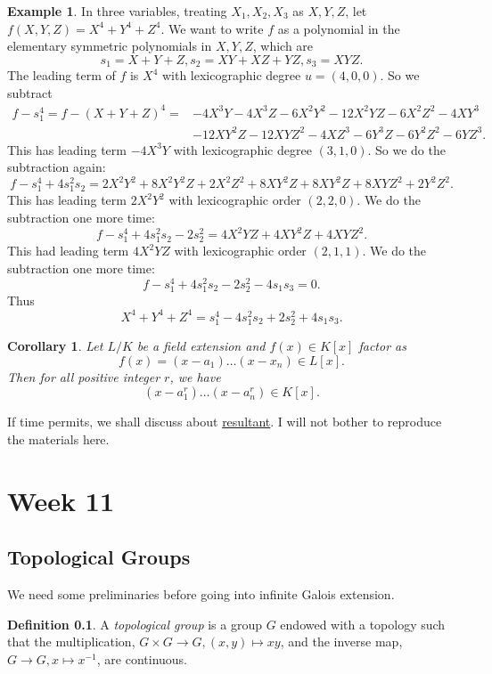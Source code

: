 \documentclass[12pt]{report}
\newtheorem{corollary}[theorem]{Corollary}
\theoremstyle{definition}
\newtheorem{definition}[theorem]{Definition}
\newtheorem{example}[theorem]{Example}
\begin{document}
\begin{example}
	In three variables, treating $X_1,X_2,X_3$ as $X,Y,Z$, let $f(X,Y,Z)=X^4+Y^4+Z^4$. We want to write $f$ as a polynomial  in the elementary symmetric polynomials in $X,Y, Z$, which are $$s_1=X+Y+Z, s_2=XY+XZ+YZ, s_3=XYZ.$$
	The leading term of $f$ is $X^4$ with lexicographic degree $u=(4,0,0)$. So we subtract \begin{align*}
		f-s_1^4= f-(X+Y+Z)^4 = & -4X^3Y-4X^3Z-6X^2Y^2-12X^2YZ-6X^2Z^2-4XY^3 \\
		 &-12XY^2Z -12XYZ^2-4XZ^3-6Y^3Z-6Y^2Z^2-6YZ^3.
	\end{align*}
	This has leading term $-4X^3Y$ with lexicographic degree $(3,1,0)$. So we do the subtraction again: $$f-s_1^4+4s_1^2s_2=2X^2Y^2+8X^2Y^2Z+2X^2Z^2+8XY^2Z+8XY^2Z+8XYZ^2+2Y^2Z^2.$$
	This has leading term $2X^2Y^2$ with lexicographic order $(2,2,0)$. We do the subtraction one more time:
	$$f-s_1^4+4s_1^2s_2-2s_2^2=4X^2YZ+4XY^2Z+4XYZ^2.$$
	This had leading term $4X^2YZ$ with lexicographic order $(2,1,1)$.
	We do the subtraction one more time:
	$$f-s_1^4+4s_1^2s_2-2s_2^2-4s_1s_3=0.$$
	Thus $$X^4+Y^4+Z^4=s_1^4-4s_1^2s_2+2s_2^2+4s_1s_3.$$
\end{example}

\begin{corollary}
	Let $L/K$ be a field extension and $f(x)\in K[x]$ factor as 
	$$f(x)=(x-a_1)\dots(x-x_n)\in L[x].$$
	Then for all positive integer $r$, we have 
	$$(x-a_1^r)\dots(x-a_n^r)\in K[x].$$
\end{corollary}

If time permits, we shall discuss about \hyperlink{http://buzzard.ups.edu/courses/2016spring/projects/woody-resultants-ups-434-2016.pdf}{resultant}. I will not bother to reproduce the materials here. 

\chapter*{Week 11}
\setcounter{chapter}{11}

\section{Topological Groups}

We need some preliminaries before going into infinite Galois extension.

\begin{definition}
	A \emph{topological group} is a group $G$ endowed with a topology such that the multiplication, $G\times G\to G,(x,y)\mapsto xy$, and the inverse map, $G\to G, x\mapsto x^{-1}$, are continuous.
\end{definition}
\end{document}
